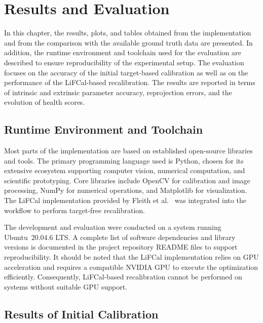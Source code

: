 \documentclass[12pt]{scrartcl}
\begin{document}
\clearpage

\section{Results and Evaluation} \label{Chapter 4}

In this chapter, the results, plots, and tables obtained from the implementation and from the comparison with the available ground truth data are presented. In addition, the runtime environment and toolchain used for the evaluation are described to ensure reproducibility of the experimental setup. The evaluation focuses on the accuracy of the initial target-based calibration as well as on the performance of the LiFCal-based recalibration. The results are reported in terms of intrinsic and extrinsic parameter accuracy, reprojection errors, and the evolution of health scores.

\subsection{Runtime Environment and Toolchain} 

Most parts of the implementation are based on established open-source libraries and tools. The primary programming language used is Python, chosen for its extensive ecosystem supporting computer vision, numerical computation, and scientific prototyping. Core libraries include OpenCV for calibration and image processing, NumPy for numerical operations, and Matplotlib for visualization. The LiFCal implementation provided by Fleith et al.~\cite{LiFCal} was integrated into the workflow to perform target-free recalibration. 
\newline 

The development and evaluation were conducted on a system running Ubuntu~20.04.6 LTS. A complete list of software dependencies and library versions is documented in the project repository README files to support reproducibility. It should be noted that the LiFCal implementation relies on GPU acceleration and requires a compatible NVIDIA GPU to execute the optimization efficiently. Consequently, LiFCal-based recalibration cannot be performed on systems without suitable GPU support.

\subsection{Results of Initial Calibration}
\end{document}
